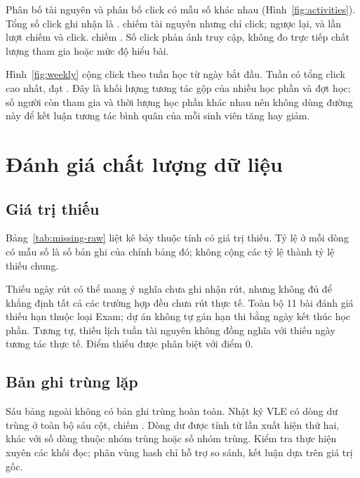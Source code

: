Phân bố tài nguyên và phân bố click có mẫu số khác nhau (Hình~\ref{fig:activities}). Tổng số click ghi nhận là \NClicks.  chiếm \ResourceAssetPct{} tài nguyên nhưng chỉ \ResourceClickPct{} click; ngược lại,  và  lần lượt chiếm \ContentClickPct{} và \ForumClickPct{} click.  chiếm \QuizClickPct. Số click phản ánh truy cập, không đo trực tiếp chất lượng tham gia hoặc mức độ hiểu bài.

Hình~\ref{fig:weekly} cộng click theo tuần học từ ngày bắt đầu. Tuần \WeeklyPeak{} có tổng click cao nhất, đạt \WeeklyPeakClicks. Đây là khối lượng tương tác gộp của nhiều học phần và đợt học; số người còn tham gia và thời lượng học phần khác nhau nên không dùng đường này để kết luận tương tác bình quân của mỗi sinh viên tăng hay giảm.
\FloatBarrier

\section{Đánh giá chất lượng dữ liệu}
\subsection{Giá trị thiếu}
Bảng~\ref{tab:missing-raw} liệt kê bảy thuộc tính có giá trị thiếu. Tỷ lệ ở mỗi dòng có mẫu số là số bản ghi của chính bảng đó; không cộng các tỷ lệ thành tỷ lệ thiếu chung.
\begin{table}[tbp]
\centering
\caption{Các thuộc tính có giá trị thiếu trên dữ liệu thô.}
\label{tab:missing-raw}

\end{table}
Thiếu ngày rút có thể mang ý nghĩa chưa ghi nhận rút, nhưng không đủ để khẳng định tất cả các trường hợp đều chưa rút thực tế. Toàn bộ 11 bài đánh giá thiếu hạn thuộc loại Exam; dự án không tự gán hạn thi bằng ngày kết thúc học phần. Tương tự, thiếu lịch tuần tài nguyên không đồng nghĩa với thiếu ngày tương tác thực tế. Điểm thiếu được phân biệt với điểm 0.

\subsection{Bản ghi trùng lặp}
Sáu bảng ngoài  không có bản ghi trùng hoàn toàn. Nhật ký VLE có \NExactDuplicates{} dòng dư trùng ở toàn bộ sáu cột, chiếm \PctExactDuplicates. Dòng dư được tính từ lần xuất hiện thứ hai, khác với số dòng thuộc nhóm trùng hoặc số nhóm trùng. Kiểm tra thực hiện xuyên các khối đọc; phân vùng hash chỉ hỗ trợ so sánh, kết luận dựa trên giá trị gốc.

